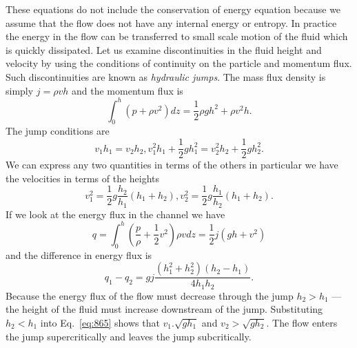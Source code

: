 These equations do not include the conservation of energy equation
because we assume that the flow does not have any internal energy or
entropy.  In practice the energy in the flow can be transferred to
small scale motion of the fluid which is quickly dissipated.  Let us
examine discontinuities in the fluid height and velocity by using the
conditions of continuity on the particle and momentum flux.  Such
discontinuities are known as {\em hydraulic jumps}. The mass
flux density is simply $j=\rho v h$ and the momentum flux is
\begin{equation}
\int_0^h \left ( p + \rho v^2 \right ) dz = \frac{1}{2} \rho g h^2 +
\rho v^2 h.
\label{eq:863}
\end{equation}
The jump conditions are 
\begin{equation}
v_1 h_1 = v_2 h_2, v_1^2 h_1 + \frac{1}{2} g h_1^2= v_2^2 h_2 + \frac{1}{2} g h_2^2.
\label{eq:864}
\end{equation}
We can express any two quantities in terms of the others in particular
we have the velocities in terms of the heights
\begin{equation}
v_1^2 = \frac{1}{2} g \frac{h_2}{h_1} \left ( h_1 + h_2 \right ),
v_2^2 = \frac{1}{2} g \frac{h_1}{h_2} \left ( h_1 + h_2 \right ).
\label{eq:865}
\end{equation}
If we look at the energy flux in the channel we have
\begin{equation}
q = \int_0^h \left ( \frac{p}{\rho} + \frac{1}{2}v^2 \right ) \rho v
dz = \frac{1}{2} j \left ( g h + v^2 \right ) 
\label{eq:866}
\end{equation}
and the difference in energy flux is
\begin{equation}
q_1 - q_2 = g j \frac{\left (h_1^2 + h_2^2 \right ) (h_2 - h_1)}{4 h_1
  h_2}. 
\label{eq:867}
\end{equation}
Because the energy flux of the flow must decrease through the jump
$h_2>h_1$ --- the height of the fluid must increase downstream of the
jump.  Substituting $h_2<h_1$ into Eq.~\ref{eq:865} shows that $v_1 .
\sqrt{g h_1}$ and $v_2 > \sqrt{g h_2}$.  The flow enters the jump
supercritically and leaves the jump subcritically.

